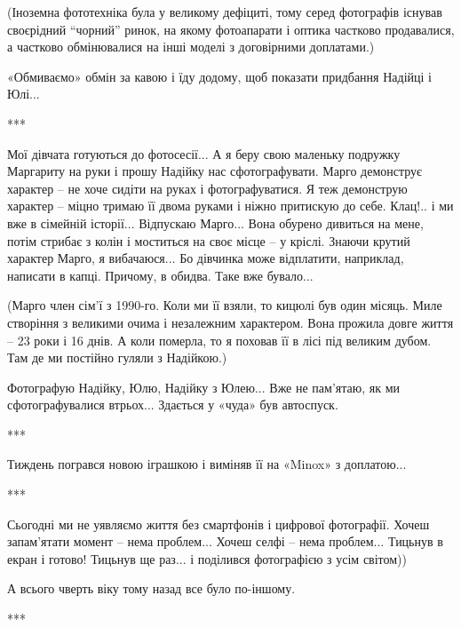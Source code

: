 
(Іноземна фототехніка була у великому дефіциті, тому серед фотографів існував
своєрідний \enquote{чорний} ринок, на якому фотоапарати і оптика частково продавалися,
а частково обмінювалися на інші моделі з договірними доплатами.)

«Обмиваємо» обмін за кавою і їду додому, щоб показати придбання Надійці і
Юлі...


***

Мої дівчата готуються до фотосесії... А я беру свою маленьку подружку Маргариту
на руки і прошу Надійку нас сфотографувати. Марго демонструє характер – не хоче
сидіти на руках і фотографуватися. Я теж демонструю характер – міцно тримаю її
двома руками і ніжно притискую до себе. Клац!.. і ми вже в сімейній історії...
Відпускаю Марго... Вона обурено дивиться на мене, потім стрибає з колін і
моститься на своє місце – у кріслі. Знаючи крутий характер Марго, я
вибачаюся... Бо дівчинка може відплатити, наприклад, написати в капці. Причому,
в обидва. Таке вже бувало...


(Марго член сім’ї з 1990-го. Коли ми її взяли, то кицюлі був один місяць. Миле
створіння з великими очима і незалежним характером. Вона прожила довге життя –
23 роки і 16 днів. А коли померла, то я поховав її в лісі під великим дубом.
Там де ми постійно гуляли з Надійкою.)

Фотографую Надійку, Юлю, Надійку з Юлею... Вже не пам’ятаю, як ми
сфотографувалися втрьох... Здається у «чуда» був автоспуск.


***

Тиждень погрався новою іграшкою і виміняв її на «Minox» з доплатою... 

***

Сьогодні ми не уявляємо життя без смартфонів і цифрової фотографії. Хочеш
запам'ятати момент – нема проблем... Хочеш селфі – нема проблем... Тицьнув в
екран і готово! Тицьнув ще раз... і поділився фотографією з усім світом))

А всього чверть віку тому назад все було по-іншому.

***

